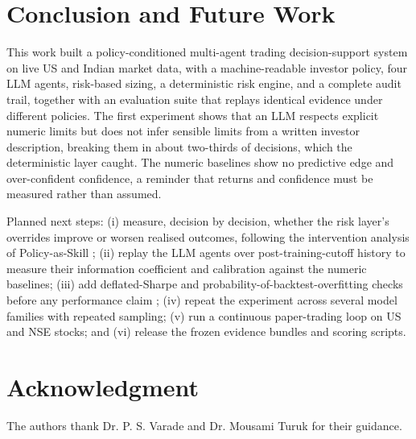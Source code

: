 \section{Conclusion and Future Work}
This work built a policy-conditioned multi-agent trading decision-support system on live US and Indian market data, with a machine-readable investor policy, four LLM agents, risk-based sizing, a deterministic risk engine, and a complete audit trail, together with an evaluation suite that replays identical evidence under different policies. The first experiment shows that an LLM respects explicit numeric limits but does not infer sensible limits from a written investor description, breaking them in about two-thirds of decisions, which the deterministic layer caught. The numeric baselines show no predictive edge and over-confident confidence, a reminder that returns and confidence must be measured rather than assumed.

Planned next steps: (i) measure, decision by decision, whether the risk layer's overrides improve or worsen realised outcomes, following the intervention analysis of Policy-as-Skill \cite{policyasskill}; (ii) replay the LLM agents over post-training-cutoff history to measure their information coefficient and calibration against the numeric baselines; (iii) add deflated-Sharpe and probability-of-backtest-overfitting checks before any performance claim \cite{bailey2014deflated,lopezdeprado2018}; (iv) repeat the experiment across several model families with repeated sampling; (v) run a continuous paper-trading loop on US and NSE stocks; and (vi) release the frozen evidence bundles and scoring scripts.

\section*{Acknowledgment}
The authors thank Dr. P. S. Varade and Dr. Mousami Turuk for their guidance.



